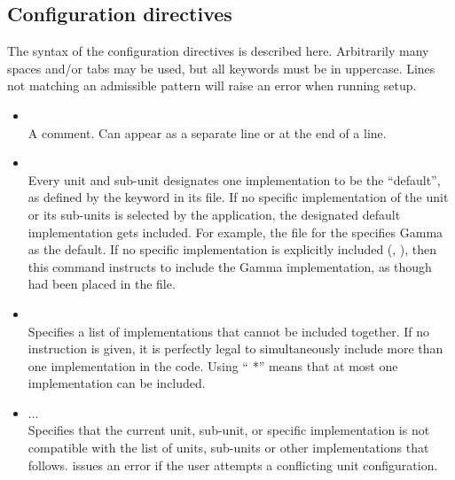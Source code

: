 \subsection{Configuration directives}\label{Sec:ConfigDirectives}
The syntax of the configuration directives is described here. Arbitrarily
many spaces and/or tabs may be used, but all keywords must be in uppercase.
Lines not matching an admissible pattern will raise an error when running
setup.

\begin{itemize}

\item {}\\
A comment. Can appear as a separate line or at the end of a line.

\item {} \\
Every unit and sub-unit designates one implementation to be the
``default'', as defined by the keyword  in its
 file. If no specific implementation of the unit or its
sub-units is selected by the application, the designated default
implementation gets included. For example, the  file for
the  specifies Gamma as the default. If no specific
implementation is explicitly included (\ie, ), then this command instructs  to
include the Gamma implementation, as though  had been placed in the  file.

\item {} \\
Specifies a list of implementations that cannot be included together. If no
 instruction is given, it is perfectly legal to
simultaneously include more than one implementation in the code. Using
`` *'' means that at most one implementation can be
included.

\item {}  ... \\
Specifies that the current unit, sub-unit, or specific implementation
is not compatible with the list of units, sub-units or other
implementations that follows. \setup issues an error if the user
attempts a conflicting unit configuration.



\end{itemize}
